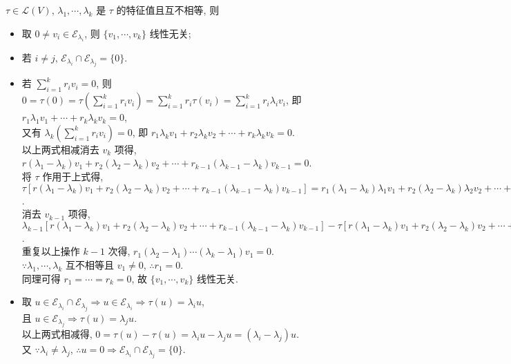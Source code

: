 \documentclass{note}
\begin{document}
\begin{thm}[(课本定理 8.4)]
    $\tau\in\mathcal{L}(V)$, $\lambda_1,\cdots,\lambda_k$ 是 $\tau$ 的特征值且互不相等, 则
    \begin{itemize}
        \item[(1)] 取 $0\neq v_i\in\mathcal{E}_{\lambda_i}$, 则 $\{v_1,\cdots,v_k\}$ 线性无关;
        \item[(2)] 若 $i\neq j$, $\mathcal{E}_{\lambda_i}\cap\mathcal{E}_{\lambda_j}=\{0\}$.
    \end{itemize}
\end{thm}
\begin{pf}
    \begin{itemize}
        \item[(1)] 若 $\sum_{i=1}^kr_iv_i=0$, 则 $0=\tau(0)=\tau\left(\sum_{i=1}^kr_iv_i\right)=\sum_{i=1}^kr_i\tau(v_i)=\sum_{i=1}^kr_i\lambda_iv_i$, 即 $r_1\lambda_1v_1+\cdots+r_k\lambda_kv_k=0$,\\
        又有 $\lambda_k\left(\sum_{i=1}^kr_iv_i\right)=0$, 即 $r_1\lambda_kv_1+r_2\lambda_kv_2+\cdots+r_k\lambda_kv_k=0$.\\
        以上两式相减消去 $v_k$ 项得, $r(\lambda_1-\lambda_k)v_1+r_2(\lambda_2-\lambda_k)v_2+\cdots+r_{k-1}(\lambda_{k-1}-\lambda_k)v_{k-1}=0$.\\
        将 $\tau$ 作用于上式得, $\tau\left[r(\lambda_1-\lambda_k)v_1+r_2(\lambda_2-\lambda_k)v_2+\cdots+r_{k-1}(\lambda_{k-1}-\lambda_k)v_{k-1}\right]=r_1(\lambda_1-\lambda_k)\lambda_1v_1+r_2(\lambda_2-\lambda_k)\lambda_2v_2+\cdots+r_{k-1}(\lambda_{k-1}-\lambda_k)\lambda_{k-1}v_{k-1}=\tau(0)=0$.\\
        消去 $v_{k-1}$ 项得, $\lambda_{k-1}\left[r(\lambda_1-\lambda_k)v_1+r_2(\lambda_2-\lambda_k)v_2+\cdots+r_{k-1}(\lambda_{k-1}-\lambda_k)v_{k-1}\right]-\tau\left[r(\lambda_1-\lambda_k)v_1+r_2(\lambda_2-\lambda_k)v_2+\cdots+r_{k-1}(\lambda_{k-1}-\lambda_k)v_{k-1}\right]=r_1(\lambda_k-\lambda_1)(\lambda_{k-1}-\lambda_1)v_1+r_2(\lambda_k-\lambda_2)(\lambda_{k-1}-\lambda_2)v_2+\cdots+r_{k-1}(\lambda_k-\lambda_{k-2})(\lambda_{k-1}-\lambda_{k-2})v_{k-2}=0$.\\
        重复以上操作 $k-1$ 次得, $r_1(\lambda_2-\lambda_1)\cdots(\lambda_k-\lambda_1)v_1=0$.\\
        $\because\lambda_1,\cdots,\lambda_k$ 互不相等且 $v_1\neq 0$, $\therefore r_1=0$.\\
        同理可得 $r_1=\cdots=r_k=0$, 故 $\{v_1,\cdots,v_k\}$ 线性无关.
        \item[(2)] 取 $u\in\mathcal{E}_{\lambda_i}\cap\mathcal{E}_{\lambda_j}\Longrightarrow u\in\mathcal{E}_{\lambda_i}\Longrightarrow\tau(u)=\lambda_iu$,\\
        且 $u\in\mathcal{E}_{\lambda_j}\Longrightarrow\tau(u)=\lambda_ju$.\\
        以上两式相减得, $0=\tau(u)-\tau(u)=\lambda_iu-\lambda_ju=(\lambda_i-\lambda_j)u$.\\
        又 $\because\lambda_i\neq\lambda_j$, $\therefore u=0\Longrightarrow\mathcal{E}_{\lambda_i}\cap\mathcal{E}_{\lambda_j}=\{0\}$.
    \end{itemize}
\end{pf}
\end{document}
